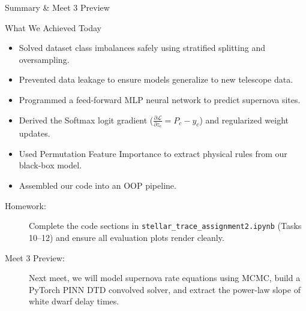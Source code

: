 \documentclass[9pt]{beamer}
\begin{document}
\begin{frame}{Summary \& Meet 3 Preview}
  \begin{block}{What We Achieved Today}
    \begin{itemize}
      \item Solved dataset class imbalances safely using stratified splitting and oversampling.
      \item Prevented data leakage to ensure models generalize to new telescope data.
      \item Programmed a feed-forward MLP neural network to predict supernova sites.
      \item Derived the Softmax logit gradient ($\frac{\partial \mathcal{L}}{\partial z_c} = P_c - y_c$) and regularized weight updates.
      \item Used Permutation Feature Importance to extract physical rules from our black-box model.
      \item Assembled our code into an OOP pipeline.
    \end{itemize}
  \end{block}
  \begin{description}
    \item[Homework:] Complete the code sections in \texttt{stellar\_trace\_assignment2.ipynb} (Tasks 10--12) and ensure all evaluation plots render cleanly.
    \item[Meet 3 Preview:] Next meet, we will model supernova rate equations using MCMC, build a PyTorch PINN DTD convolved solver, and extract the power-law slope of white dwarf delay times.
  \end{description}
\end{frame}
\end{document}
